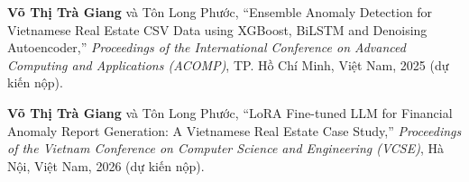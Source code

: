 
\noindent [1] \textbf{Võ Thị Trà Giang} và Tôn Long Phước,
``Ensemble Anomaly Detection for Vietnamese Real Estate CSV Data using XGBoost, BiLSTM and Denoising Autoencoder,''
\textit{Proceedings of the International Conference on Advanced Computing and Applications (ACOMP)},
TP. Hồ Chí Minh, Việt Nam, 2025 (dự kiến nộp).

\medskip
\noindent [2] \textbf{Võ Thị Trà Giang} và Tôn Long Phước,
``LoRA Fine-tuned LLM for Financial Anomaly Report Generation: A Vietnamese Real Estate Case Study,''
\textit{Proceedings of the Vietnam Conference on Computer Science and Engineering (VCSE)},
Hà Nội, Việt Nam, 2026 (dự kiến nộp).
